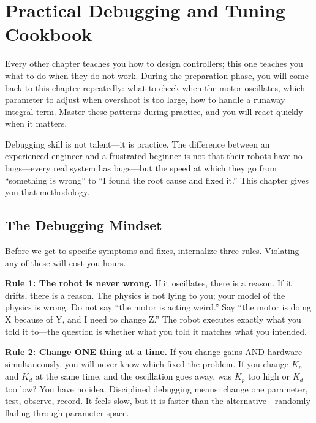 \section{Practical Debugging and Tuning Cookbook}

Every other chapter teaches you how to design controllers; this one teaches you what to do when they do not work. During the preparation phase, you will come back to this chapter repeatedly: what to check when the motor oscillates, which parameter to adjust when overshoot is too large, how to handle a runaway integral term. Master these patterns during practice, and you will react quickly when it matters.

Debugging skill is not talent---it is practice. The difference between an experienced engineer and a frustrated beginner is not that their robots have no bugs---every real system has bugs---but the speed at which they go from ``something is wrong'' to ``I found the root cause and fixed it.'' This chapter gives you that methodology.

\subsection{The Debugging Mindset}

Before we get to specific symptoms and fixes, internalize three rules. Violating any of these will cost you hours.

\textbf{Rule 1: The robot is never wrong.} If it oscillates, there is a reason. If it drifts, there is a reason. The physics is not lying to you; your model of the physics is wrong. Do not say ``the motor is acting weird.'' Say ``the motor is doing X because of Y, and I need to change Z.'' The robot executes exactly what you told it to---the question is whether what you told it matches what you intended.

\textbf{Rule 2: Change ONE thing at a time.} If you change gains AND hardware simultaneously, you will never know which fixed the problem. If you change $K_p$ and $K_d$ at the same time, and the oscillation goes away, was $K_p$ too high or $K_d$ too low? You have no idea. Disciplined debugging means: change one parameter, test, observe, record. It feels slow, but it is faster than the alternative---randomly flailing through parameter space.

